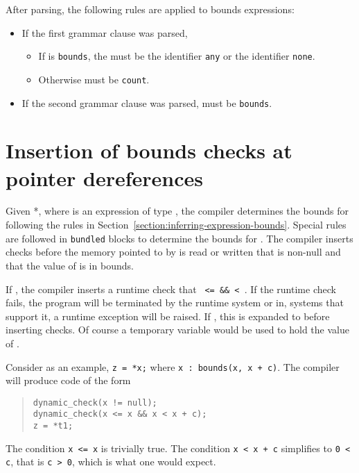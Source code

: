 After parsing, the following rules are applied to bounds
expressions:
\begin{itemize}
\item If the first grammar clause was parsed,
\begin{itemize}
\item If  is \texttt{bounds}, the 
must be the identifier \texttt{any} or the identifier \texttt{none}.
\item Otherwise  must be \texttt{count}.
\end{itemize}
\item If the second grammar clause was parsed,  must be
\texttt{bounds}.
\end{itemize}

\section{Insertion of bounds checks at pointer dereferences}

\label{section:bounds-checking-indirections}

Given *, where  is an expression of type
\arrayptr, the compiler determines the bounds for 
following the rules in Section~\ref{section:inferring-expression-bounds}.
Special rules are followed in
\texttt{bundled} blocks to determine the bounds for . The
compiler inserts checks before the memory pointed to by  is
read or written that  is non-null and that the value of
 is in bounds.

If ,
the compiler inserts a runtime check that \texttt{ <=  \&\&
 < }. If the runtime check fails, the program
will be terminated by the runtime system or in, systems that support it,
a runtime exception will be raised.   If ,
this is expanded to 
before inserting checks.  Of course a temporary variable would be used to hold the
value of .

Consider as an example, \verb|z = *x;| where 
\verb|x : bounds(x, x + c)|. The compiler will produce code of the form

\begin{quote}
\begin{verbatim}
dynamic_check(x != null);
dynamic_check(x <= x && x < x + c);
z = *t1;
\end{verbatim}
\end{quote}
The condition \texttt{x <= x} is trivially true. The
condition \texttt{x < x + c} simplifies to \texttt{0
< c}, that is \texttt{c > 0}, which is what one
would expect.

